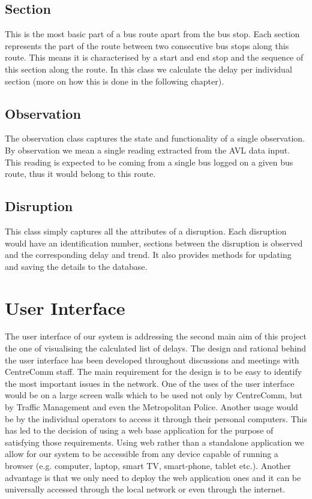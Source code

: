 \subsection{Section}
This is the most basic part of a bus route apart from the bus stop. Each section represents the part of the route between two consecutive bus stops along this route. This means it is characterised by a start and end stop and the sequence of this section along the route. In this class we calculate the delay per individual section (more on how this is done in the following chapter).

\subsection{Observation}
The observation class captures the state and functionality of a single observation. By observation we mean a single reading extracted from the AVL data input. This reading is expected to be coming from a single bus logged on a given bus route, thus it would belong to this route. 

\subsection{Disruption}
This class simply captures all the attributes of a disruption. Each disruption would have an identification number, sections between the disruption is observed and the corresponding delay and trend. It also provides methods for updating and saving the details to the database.

\FloatBarrier
\section{User Interface}
The user interface of our system is addressing the second main aim of this project the one of visualising the calculated list of delays. The design and rational behind the user interface has been developed throughout discussions and meetings with CentreComm staff. The main requirement for the design is to be easy to identify the most important issues in the network. One of the uses of the user interface would be on a large screen walls which to be used not only by CentreComm, but by Traffic Management and even the Metropolitan Police. Another usage would be by the individual operators to access it through their personal computers. This has led to the decision of using a web base application for the purpose of satisfying those requirements. Using web rather than a standalone application we allow for our system to be accessible from any device capable of running a browser (e.g. computer, laptop, smart TV, smart-phone, tablet etc.). Another advantage is that we only need to deploy the web application ones and it can be universally accessed through the local network or even through the internet.

